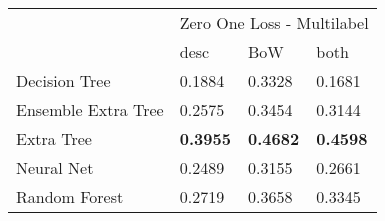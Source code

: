 \begin{tabular}{|l|l|l|l| }
\hline
 &  \multicolumn{3}{c|}{Zero One Loss - Multilabel} \\
\cline{2-4} & desc & BoW & both \\ \hline
Decision Tree       & 0.1884 & 0.3328 & 0.1681\\
Ensemble Extra Tree & 0.2575 & 0.3454 & 0.3144\\
Extra Tree          & {\bf 0.3955} & {\bf 0.4682} & {\bf 0.4598}\\
Neural Net          & 0.2489 & 0.3155 & 0.2661\\
Random Forest       & 0.2719 & 0.3658 & 0.3345\\
\hline
\end{tabular}